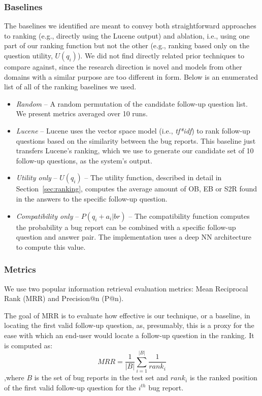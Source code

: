 \subsubsection{Baselines}
The baselines we identified are meant to convey both straightforward approaches to ranking (e.g., directly using the Lucene output) and
ablation, i.e., using one part of our ranking function but not the other (e.g., ranking based only on the question utility, $U(q_{i})$).
We did not find directly related prior techniques to compare against, since the research direction is novel and models from other domains
with a similar purpose are too different in form. Below is an enumerated list of all of the ranking baselines we used.
\begin{itemize}
\item {\em Random} -- A random permutation of the candidate follow-up question list. We present metrics averaged over 10 runs.
\item {\em Lucene} -- Lucene uses the vector space model (i.e., {\em tf*idf}) to rank follow-up questions based on the similarity between the bug reports. This baseline just transfers Lucene's ranking, which we use to generate our candidate set of 10 follow-up questions, as the system's output.
\item {\em Utility only} -- $U(q_{i})$ -- The utility function, described in detail in Section~\ref{sec:ranking}, computes the average amount of OB, EB or S2R found in the answers to the specific follow-up question.
\item {\em Compatibility only} -- $P(q_{i}+a_{i}|br)$ -- The compatibility function computes the probability a bug report can be combined with a specific follow-up question and answer pair. The implementation uses a deep NN architecture to compute this value.
\end{itemize}

\subsubsection{Metrics}
We use two popular information retrieval evaluation metrics: Mean Reciprocal Rank (MRR) and Precision@n (P@n).

The goal of MRR is to evaluate how effective is our technique, or a baseline, in locating the first valid follow-up question, as, presumably, this is a proxy for the ease with which an end-user would locate a follow-up question in the ranking. It is
computed as: $$MRR = \frac{1}{|B|} \sum_{i=1}^{|B|} \frac{1}{rank_{i}}$$ ,where $B$ is the set of bug reports in the test set and $rank_{i}$ is the ranked position of the first valid follow-up question for the $i^{th}$ bug report.

